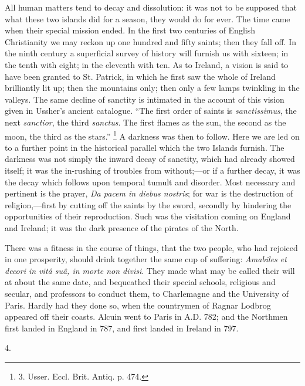 All human matters tend to
decay and dissolution: it was not to be supposed that what these two
islands did for a season, they would do for ever. The time came when
their special mission ended. In the first two centuries of English
Christianity we may reckon up one hundred and fifty saints; then they
fall off. In the ninth century a superficial survey of history will
furnish us with sixteen; in the tenth with eight; in the eleventh with
ten. As to Ireland, a vision is said to have been granted to St.
Patrick, in which he first saw the whole of Ireland brilliantly lit
up; then the mountains only; then only a few lamps twinkling in the
valleys. The same decline of sanctity is intimated in the account of
this vision given in Ussher's ancient catalogue. ``The first order of
saints is \emph{sanctissimus}, the next \emph{sanctior}, the third \emph{sanctus}.
The first flames as the sun, the second as the moon, the third as the
stars.'' \footnote{3.
Usser. Eccl. Brit. Antiq. p. 474.} A darkness was
then to follow. Here we are led on to a further point in the
historical parallel which the two Islands furnish. The darkness was
not simply the inward decay of sanctity, which had already showed
itself; it was the in-rushing of troubles from without;—or if a
further decay, it was the decay which follows upon temporal tumult and
disorder. Most necessary and pertinent is the prayer, \emph{Da
pacem in diebus nostris}; for war is the destruction of
religion,—first by cutting off the saints by the sword, secondly by
hindering the opportunities of their reproduction. Such was the
visitation coming on England and Ireland; it was the dark presence of
the pirates of the North.

There was a fitness in the
course of things, that the two people, who had rejoiced in one
prosperity, should drink together the same cup of suffering: \emph{Amabiles
et decori in vitâ suâ, in morte non divisi}. They made what may
be called their will at about the same date, and bequeathed their
special schools, religious and secular, and professors to conduct
them, to Charlemagne and the University of Paris. Hardly had they done
so, when the countrymen of Ragnar Lodbrog appeared off their coasts.
Alcuin went to Paris in A.D. 782; and the Northmen first landed in
England in 787, and first landed in Ireland in 797.

4.

